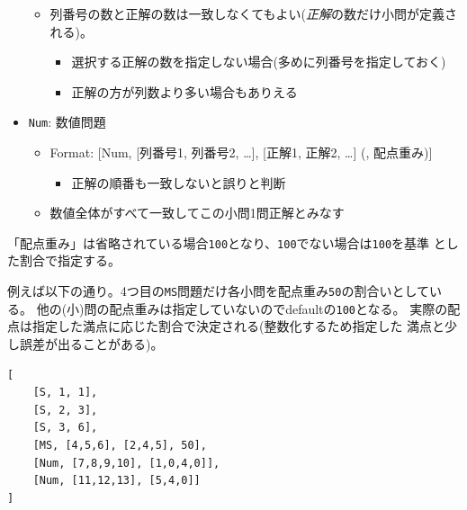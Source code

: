 \begin{itemize}
\begin{itemize}
\begin{itemize}
\end{itemize}

\item 列番号の数と正解の数は一致しなくてもよい(\emph{正解}の数だけ小問が定義される)。

\begin{itemize}
\item 選択する正解の数を指定しない場合(多めに列番号を指定しておく)

\item 正解の方が列数より多い場合もありえる

\end{itemize}

\end{itemize}

\item \texttt{Num}: 数値問題

\begin{itemize}
\item Format: {[Num, {[列番号1, 列番号2, {\ldots}]}, {[正解1, 正解2, {\ldots}]} (, 配点重み)]}

\begin{itemize}
\item 正解の順番も一致しないと誤りと判断

\end{itemize}

\item 数値全体がすべて一致してこの小問1問正解とみなす

\end{itemize}

\end{itemize}
「配点重み」は省略されている場合\texttt{100}となり、\texttt{100}でない場合は\texttt{100}を基準
とした割合で指定する。

例えば以下の通り。4つ目の\texttt{MS}問題だけ各小問を配点重み\texttt{50}の割合いとしている。
他の(小)問の配点重みは指定していないのでdefaultの\texttt{100}となる。
実際の配点は指定した満点に応じた割合で決定される(整数化するため指定した
満点と少し誤差が出ることがある)。
\begin{tcolorbox}[enhanced jigsaw,breakable,colframe=\mycolor ,colback=white,colbacktitle=\mycolor ,coltitle=white,fonttitle=\bfseries\sffamily,title=正解定義ファイルの例]

\begin{verbatim}
[
    [S, 1, 1],
    [S, 2, 3],
    [S, 3, 6],
    [MS, [4,5,6], [2,4,5], 50],
    [Num, [7,8,9,10], [1,0,4,0]],
    [Num, [11,12,13], [5,4,0]]
]
\end{verbatim}

\end{tcolorbox}

